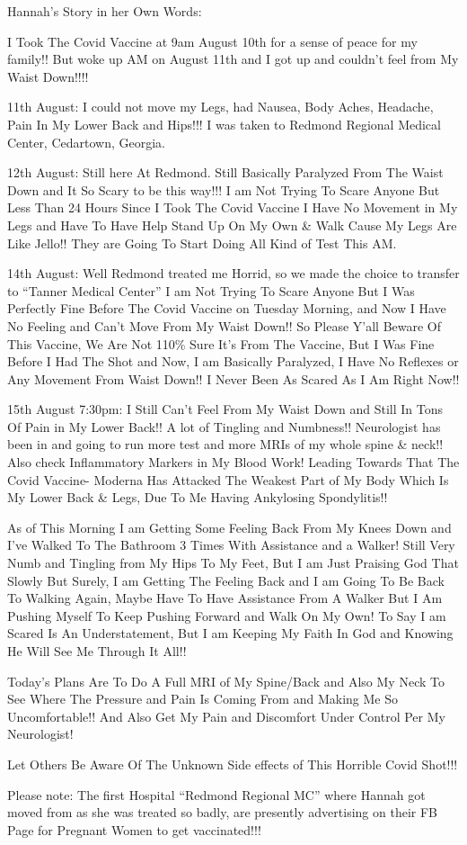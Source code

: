 Hannah’s Story in her Own Words:

I Took The Covid Vaccine at 9am August 10th for a sense of peace for my family!!
But woke up AM on August 11th and I got up and couldn’t feel from My Waist
Down!!!!

11th August: I could not move my Legs, had Nausea, Body Aches, Headache, Pain In
My Lower Back and Hips!!! I was taken to Redmond Regional Medical Center,
Cedartown, Georgia.

12th August: Still here At Redmond. Still Basically Paralyzed From The Waist
Down and It So Scary to be this way!!! I am Not Trying To Scare Anyone But Less
Than 24 Hours Since I Took The Covid Vaccine I Have No Movement in My Legs and
Have To Have Help Stand Up On My Own \& Walk Cause My Legs Are Like Jello!! They
are Going To Start Doing All Kind of Test This AM.

14th August: Well Redmond treated me Horrid, so we made the choice to transfer
to “Tanner Medical Center” I am Not Trying To Scare Anyone But I Was Perfectly
Fine Before The Covid Vaccine on Tuesday Morning, and Now I Have No Feeling and
Can’t Move From My Waist Down!! So Please Y’all Beware Of This Vaccine, We Are
Not 110\% Sure It’s From The Vaccine, But I Was Fine Before I Had The Shot and
Now, I am Basically Paralyzed, I Have No Reflexes or Any Movement From Waist
Down!! I Never Been As Scared As I Am Right Now!!

15th August 7:30pm: I Still Can’t Feel From My Waist Down and Still In Tons Of
Pain in My Lower Back!! A lot of Tingling and Numbness!! Neurologist has been in
and going to run more test and more MRIs of my whole spine \& neck!! Also check
Inflammatory Markers in My Blood Work! Leading Towards That The Covid Vaccine-
Moderna Has Attacked The Weakest Part of My Body Which Is My Lower Back \& Legs,
Due To Me Having Ankylosing Spondylitis!!

As of This Morning I am Getting Some Feeling Back From My Knees Down and I’ve
Walked To The Bathroom 3 Times With Assistance and a Walker! Still Very Numb and
Tingling from My Hips To My Feet, But I am Just Praising God That Slowly But
Surely, I am Getting The Feeling Back and I am Going To Be Back To Walking
Again, Maybe Have To Have Assistance From A Walker But I Am Pushing Myself To
Keep Pushing Forward and Walk On My Own! To Say I am Scared Is An
Understatement, But I am Keeping My Faith In God and Knowing He Will See Me
Through It All!!

Today’s Plans Are To Do A Full MRI of My Spine/Back and Also My Neck To See
Where The Pressure and Pain Is Coming From and Making Me So Uncomfortable!! And
Also Get My Pain and Discomfort Under Control Per My Neurologist!

Let Others Be Aware Of The Unknown Side effects of This Horrible Covid Shot!!!

Please note: The first Hospital “Redmond Regional MC” where Hannah got moved
from as she was treated so badly, are presently advertising on their FB Page for
Pregnant Women to get vaccinated!!!

